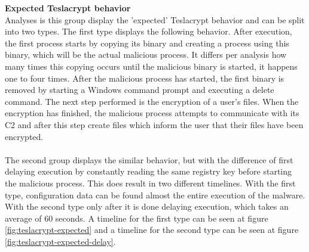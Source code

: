 \documentclass[conference]{IEEEtran}
\begin{document}
\textbf{Expected Teslacrypt behavior}\\
Analyses is this group display the 'expected' Teslacrypt behavior \cite{wyke-currans} and can be split into two types. The first type displays the following behavior. After execution, the first process starts by copying its binary and creating a process using this binary, which will be the actual malicious process. It differs per analysis how many times this copying occurs until the malicious binary is started, it happens one to four times. After the malicious process has started, the first binary is removed by starting a Windows command prompt and executing a delete command. The next step performed is the encryption of a user's files. When the encryption has finished, the malicious process attempts to communicate with its C2 and after this step create files which inform the user that their files have been encrypted.\\
\\The second group displays the similar behavior, but with the difference of first delaying execution by constantly reading the same registry key before starting the malicious process. This does result in two different timelines. With the first type, configuration data can be found almost the entire execution of the malware. With the second type only after it is done delaying execution, which takes an average of 60 seconds. A timeline for the first type can be seen at figure \ref{fig:teslacrypt-expected} and a timeline for the second type can be seen at figure \ref{fig:teslacrypt-expected-delay}.
\end{document}
